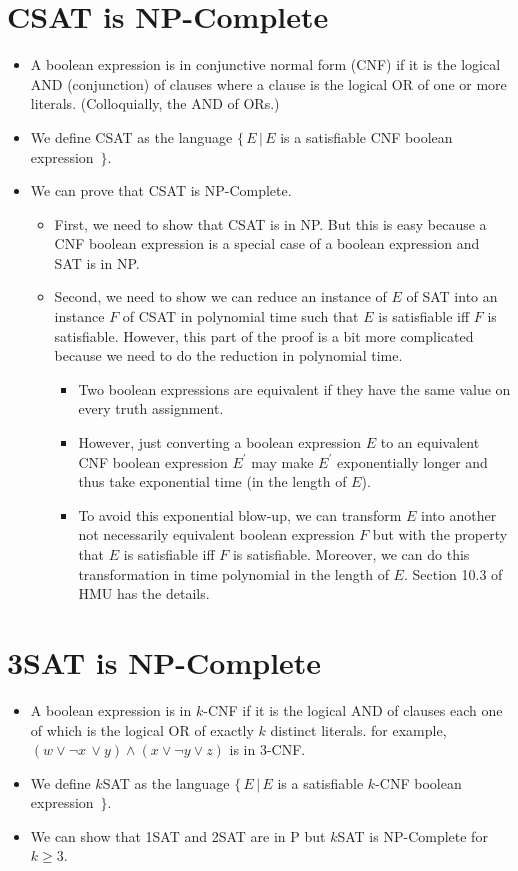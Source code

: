 \documentclass[]{article}
\begin{document}
\section{CSAT is NP-Complete}
\begin{itemize}
\item A boolean expression is in conjunctive normal form (CNF) if it is the
logical AND (conjunction) of clauses where a clause is the logical OR of one or
more literals. (Colloquially, the AND of ORs.)
\item We define CSAT as the language $\{\,E\,|\,E$ is a satisfiable CNF boolean
expression $\,\}$.
\item We can prove that CSAT is NP-Complete.
\begin{itemize}
\item First, we need to show that CSAT is in NP. But this is easy because a CNF
boolean expression is a special case of a boolean expression and SAT is in NP.
\item Second, we need to show we can reduce an instance of $E$ of SAT into an
instance $F$ of CSAT in polynomial time such that $E$ is satisfiable iff $F$ is
satisfiable. However, this part of the proof is a bit more complicated because
we need to do the reduction in polynomial time.
\begin{itemize}
\item Two boolean expressions are equivalent if they have the same value on
every truth assignment.
\item However, just converting a boolean expression $E$ to an equivalent CNF
boolean expression $E^\prime$ may make $E^\prime$ exponentially longer and thus
take exponential time (in the length of $E$).
\item To avoid this exponential blow-up, we can transform $E$ into another not
necessarily equivalent boolean expression $F$ but with the property that $E$ is
satisfiable iff $F$ is satisfiable. Moreover, we can do this transformation in
time polynomial in the length of $E$. Section 10.3 of HMU has the details.
\end{itemize}
\end{itemize}
\end{itemize}

\section{3SAT is NP-Complete}
\begin{itemize}
\item A boolean expression is in $k$-CNF if it is the logical AND of clauses
each one of which is the logical OR of exactly $k$ distinct literals. for
example, $(w\vee\neg x\,\vee y)\wedge(x\vee\neg y \vee z)$ is in 3-CNF.
\item We define $k$SAT as the language $\{\,E\,|\,E$ is a satisfiable $k$-CNF
boolean expression $\,\}$.
\item We can show that 1SAT and 2SAT are in P but $k$SAT is NP-Complete for $k
\geq 3$.
\end{itemize}
\end{document}

